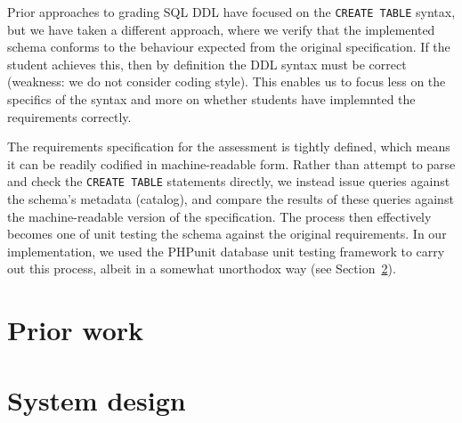 \documentclass[sigconf, authordraft]{acmart}
\begin{document}
Prior approaches to grading SQL DDL have focused on the \texttt{CREATE TABLE} syntax, but we have taken a different approach, where we verify that the implemented schema conforms to the behaviour expected from the original specification. If the student achieves this, then by definition the DDL syntax must be correct (weakness: we do not consider coding style). This enables us to focus less on the specifics of the syntax and more on whether students have implemnted the requirements correctly.

The requirements specification for the assessment is tightly defined, which means it can be readily codified in machine-readable form. Rather than attempt to parse and check the \texttt{CREATE TABLE} statements directly, we instead issue queries against the schema's metadata (catalog), and compare the results of these queries against the machine-readable version of the specification. The process then effectively becomes one of unit testing the schema against the original requirements. In our implementation, we used the PHPunit database unit testing framework to carry out this process, albeit in a somewhat unorthodox way (see Section~\ref{sec-design}).


\section{Prior work}
\label{sec-literature}


\section{System design}
\label{sec-design}

\end{document}
